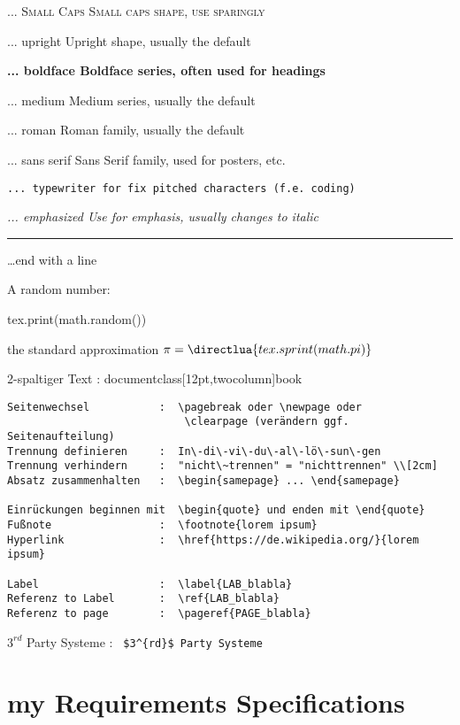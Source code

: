 \textsc{... Small Caps Small caps shape, use sparingly}

\textup{... upright Upright shape, usually the default}

\textbf{... boldface Boldface series, often used for headings}

\textmd{... medium Medium series, usually the default}

\textrm{... roman Roman family, usually the default}

\textsf{... sans serif Sans Serif family, used for posters, etc.}

\texttt{... typewriter for fix pitched characters (f.e. coding)}

\emph{... emphasized Use for emphasis, usually changes to italic}

\rule{\textwidth}{0.5pt} %
\dots end with a line

A random number:
\begin{luacode}
    tex.print(math.random())
\end{luacode}

the standard approximation $\pi = \directlua{tex.sprint(math.pi)}$


2-spaltiger Text        :  documentclass[12pt,twocolumn]{book}

\begin{verbatim}
Seitenwechsel           :  \pagebreak oder \newpage oder
                            \clearpage (verändern ggf. Seitenaufteilung)
Trennung definieren     :  In\-di\-vi\-du\-al\-lö\-sun\-gen
Trennung verhindern     :  "nicht\~trennen" = "nichttrennen" \\[2cm]
Absatz zusammenhalten   :  \begin{samepage} ... \end{samepage}

Einrückungen beginnen mit  \begin{quote} und enden mit \end{quote}
Fußnote                 :  \footnote{lorem ipsum}
Hyperlink               :  \href{https://de.wikipedia.org/}{lorem ipsum}

Label                   :  \label{LAB_blabla}
Referenz to Label       :  \ref{LAB_blabla}
Referenz to page        :  \pageref{PAGE_blabla}

\end{verbatim}
$3^{rd}$ Party Systeme  :  \verb+ $3^{rd}$ Party Systeme +

\section{my Requirements Specifications}



